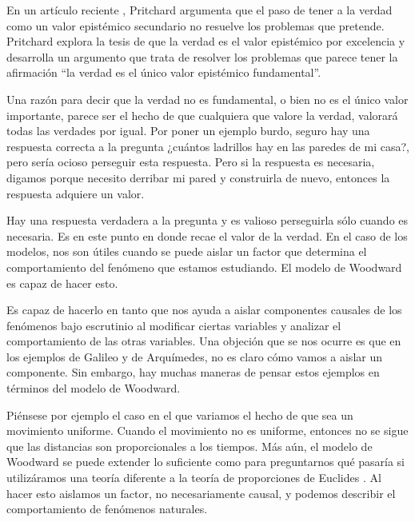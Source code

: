 \noindent En un artículo reciente \cite{Pritchard2019}, Pritchard argumenta que el paso de tener a la verdad como un valor epistémico secundario no resuelve los problemas que pretende. Pritchard explora la tesis de que la verdad es el valor epistémico por excelencia y desarrolla un argumento que trata de resolver los problemas que parece tener la afirmación ``la verdad es el único valor epistémico fundamental''.

Una razón para decir que la verdad no es fundamental, o bien no es el único valor importante, parece ser el hecho de que cualquiera que valore la verdad, valorará todas las verdades por igual. Por poner un ejemplo burdo, seguro hay una respuesta correcta a la pregunta ¿cuántos ladrillos hay en las paredes de mi casa?, pero sería ocioso perseguir esta respuesta. Pero si la respuesta es necesaria, digamos porque necesito derribar mi pared y construirla de nuevo, entonces la respuesta adquiere un valor.

Hay una respuesta verdadera a la pregunta y es valioso perseguirla sólo cuando es necesaria. Es en este punto en donde recae el valor de la verdad. En el caso de los modelos, nos son útiles cuando se puede aislar un factor que determina el comportamiento del fenómeno que estamos estudiando. El modelo de Woodward es capaz de hacer esto.

Es capaz de hacerlo en tanto que nos ayuda a aislar componentes causales de los fenómenos bajo escrutinio al modificar ciertas variables y analizar el comportamiento de las otras variables. Una objeción que se nos ocurre es que en los ejemplos de Galileo y de Arquímedes, no es claro cómo vamos a aislar un componente. Sin embargo, hay muchas maneras de pensar estos ejemplos en términos del modelo de Woodward.

Piénsese por ejemplo el caso en el que variamos el hecho de que sea un movimiento uniforme. Cuando el movimiento no es uniforme, entonces no se sigue que las distancias son proporcionales a los tiempos. Más aún, el modelo de Woodward se puede extender lo suficiente como para preguntarnos qué pasaría si utilizáramos una teoría diferente a la teoría de proporciones de Euclides \cite{Woodward2018}. Al hacer esto aislamos un factor, no necesariamente causal, y podemos describir el comportamiento de fenómenos naturales.

